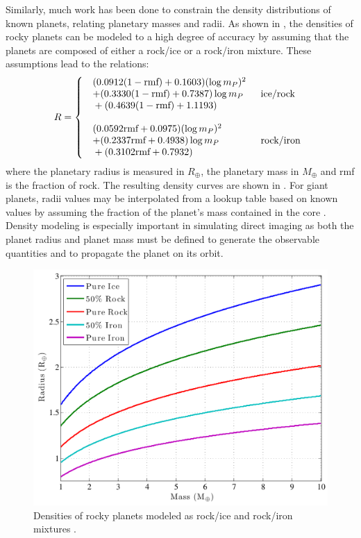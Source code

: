Similarly, much work has been done to constrain the density distributions of known planets, relating planetary masses and radii.  As shown in \citet{fortney2007}, the densities of rocky planets can be modeled to a high degree of accuracy by assuming that the planets are composed of either a rock/ice or a rock/iron mixture.  These assumptions lead to the relations:
\begin{equation}\label{eq:rockyPlanDensities}
R = \left\{ \begin{array}{l l} 
\begin{array}{l} (0.0912(1-\textrm{rmf}) + 0.1603)(\log m_P)^2\\ + (0.3330(1-\textrm{rmf}) + 0.7387)\log m_P \\
{} + (0.4639 (1-\textrm{rmf}) + 1.1193) \end{array} & \textrm{ice/rock} \\\\
\begin{array}{l} (0.0592\textrm{rmf} + 0.0975)(\log m_P)^2\\ + (0.2337\textrm{rmf} + 0.4938)\log m_P \\
{} + (0.3102\textrm{rmf} + 0.7932) \end{array} & \textrm{rock/iron}
\end{array} \right.
\end{equation}
where the planetary radius is measured in $R_\oplus$, the planetary mass in $M_\oplus$ and rmf is the fraction of rock.  The resulting density curves are shown in .  For giant planets, radii values may be interpolated from a lookup table based on known values by assuming the fraction of the planet's mass contained in the core \citep{fortney2007}.  Density modeling is especially important in simulating direct imaging as both the planet radius and planet mass must be defined to generate the observable quantities and to propagate the planet on its orbit.

\begin{figure}[ht]
\centering
\includegraphics[width=5.5in]{./figures/fortneyDensities}
 \caption[Rocky planet densities]{ Densities of rocky planets modeled as rock/ice and rock/iron mixtures \citep{fortney2007}.}
\label{fig:fortneyDensities} 
\end{figure} 

